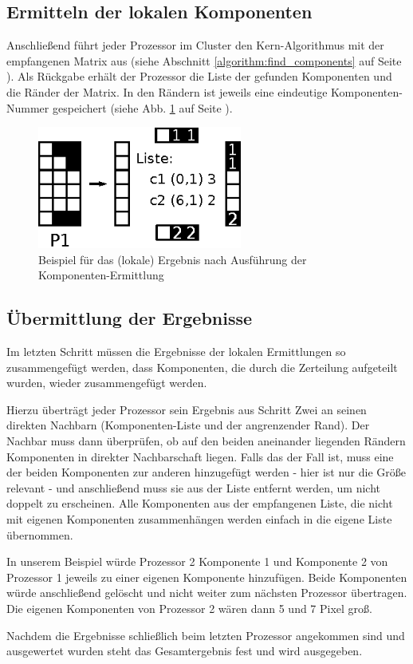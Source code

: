 \subsection{Ermitteln der lokalen Komponenten}

Anschließend führt jeder Prozessor im Cluster den Kern-Algorithmus mit der empfangenen Matrix aus (siehe Abschnitt \ref{algorithm:find_components} auf Seite \pageref{algorithm:find_components}). Als Rückgabe erhält der Prozessor die Liste der gefunden Komponenten und die Ränder der Matrix. In den Rändern ist jeweils eine eindeutige Komponenten-Nummer gespeichert (siehe Abb. \ref{fig:find_result} auf Seite \pageref{fig:find_result}).

\begin{figure}[tbhp]
	\centering
	\includegraphics[width=0.6\textwidth]{images/find_result.eps}
	\caption{Beispiel für das (lokale) Ergebnis nach Ausführung der Komponenten-Ermittlung}
	\label{fig:find_result}
\end{figure}

\subsection{Übermittlung der Ergebnisse}

Im letzten Schritt müssen die Ergebnisse der lokalen Ermittlungen so zusammengefügt werden, dass Komponenten, die durch die Zerteilung aufgeteilt wurden, wieder zusammengefügt werden.

Hierzu überträgt jeder Prozessor sein Ergebnis aus Schritt Zwei an seinen direkten Nachbarn (Komponenten-Liste und der angrenzender Rand). Der Nachbar muss dann überprüfen, ob auf den beiden aneinander liegenden Rändern Komponenten in direkter Nachbarschaft liegen. Falls das der Fall ist, muss eine der beiden Komponenten zur anderen hinzugefügt werden - hier ist nur die Größe relevant - und anschließend muss sie aus der Liste entfernt werden, um nicht doppelt zu erscheinen. Alle Komponenten aus der empfangenen Liste, die nicht mit eigenen Komponenten zusammenhängen werden einfach in die eigene Liste übernommen.

In unserem Beispiel würde Prozessor 2 Komponente 1 und Komponente 2 von Prozessor 1 jeweils zu einer eigenen Komponente hinzufügen. Beide Komponenten würde anschließend gelöscht und nicht weiter zum nächsten Prozessor übertragen. Die eigenen Komponenten von Prozessor 2 wären dann 5 und 7 Pixel groß.

Nachdem die Ergebnisse schließlich beim letzten Prozessor angekommen sind und ausgewertet wurden steht das Gesamtergebnis fest und wird ausgegeben.